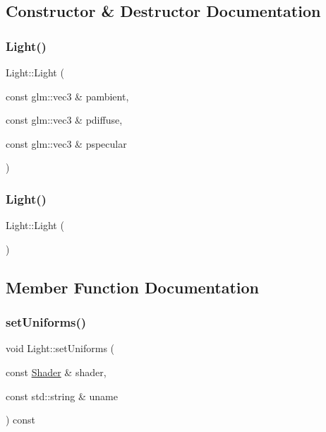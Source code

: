 \subsection{Constructor \& Destructor Documentation}
\mbox{\label{classLight_aa563bb3ddf329e69f3026aafe309bb70}} 
\subsubsection{\texorpdfstring{Light()}{Light()}\hspace{0.1cm}{\footnotesize\ttfamily [1/2]}}
{\footnotesize\ttfamily Light\+::\+Light (\begin{DoxyParamCaption}\item[{const glm\+::vec3 \&}]{pambient,  }\item[{const glm\+::vec3 \&}]{pdiffuse,  }\item[{const glm\+::vec3 \&}]{pspecular }\end{DoxyParamCaption})}

\mbox{\label{classLight_aeb5df09a25a32f19fdffa761268ba24f}} 
\subsubsection{\texorpdfstring{Light()}{Light()}\hspace{0.1cm}{\footnotesize\ttfamily [2/2]}}
{\footnotesize\ttfamily Light\+::\+Light (\begin{DoxyParamCaption}{ }\end{DoxyParamCaption})}



\subsection{Member Function Documentation}
\mbox{\label{classLight_adfffa53d21bbeaa638c0bc5ae5a852cc}} 
\subsubsection{\texorpdfstring{set\+Uniforms()}{setUniforms()}}
{\footnotesize\ttfamily void Light\+::set\+Uniforms (\begin{DoxyParamCaption}\item[{const \hyperlink{classShader}{Shader} \&}]{shader,  }\item[{const std\+::string \&}]{uname }\end{DoxyParamCaption}) const\hspace{0.3cm}{\ttfamily [virtual]}}



